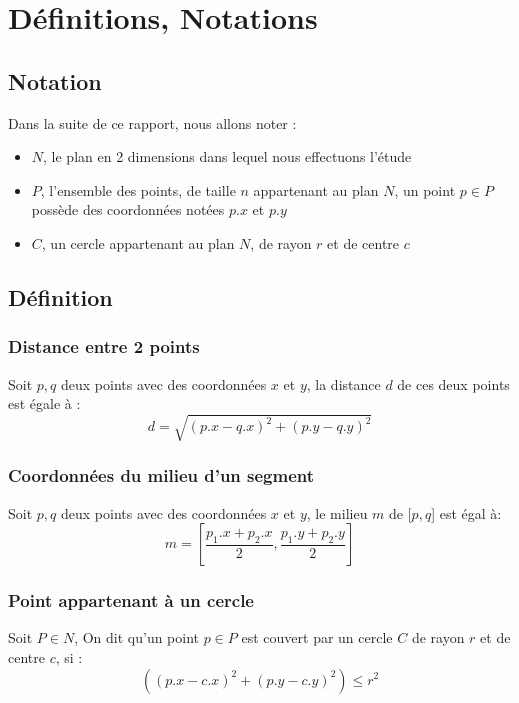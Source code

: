 \documentclass[12pt, a4paper, titlepage]{article}
\begin{document}
\section{Définitions, Notations}
\subsection{Notation}
    Dans la suite de ce rapport, nous allons noter :
    \begin{itemize}
        \item $N$, le plan en 2 dimensions dans lequel nous effectuons l'étude
        \item $P$, l'ensemble des points, de taille $n$ appartenant au plan $N$, un point $p \in P$ possède des coordonnées notées $p.x$ et $p.y$
        \item $C$, un cercle appartenant au plan $N$, de rayon $r$ et de centre $c$
    \end{itemize}
    
    \subsection{Définition}

        \subsubsection{Distance entre 2 points}
        Soit $p,q$ deux points avec des coordonnées $x$ et $y$, la distance $d$ de ces deux points est égale à : 
            \begin{equation}\label{eq:distance}
                d = \sqrt{(p.x - q.x)^{2} + (p.y - q.y)^{2}}
            \end{equation}
        \subsubsection{Coordonnées du milieu d'un segment}
        Soit $p,q$ deux points avec des coordonnées $x$ et $y$, le milieu $m$ de [$p,q$] est égal à:
        \begin{equation}
            m = [\frac{p_{1}.x+p_{2}.x}{2}, \frac{p_{1}.y+p_{2}.y}{2}]
        \end{equation}
        \subsubsection{Point appartenant à un cercle}
        Soit $P \in N$, On dit qu'un point $p \in P$ est couvert par un cercle $C$ de rayon $r$ et de centre $c$, si :
        \begin{equation}
            ((p.x - c.x)^{2} + (p.y - c.y)^{2}) \leq r^{2}
        \end{equation}
\end{document}
